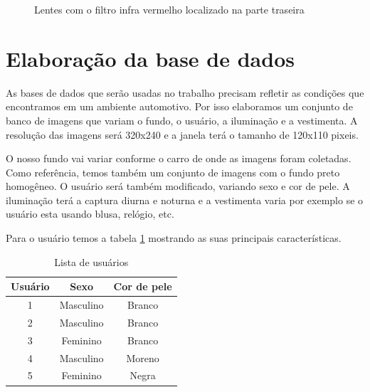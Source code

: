 \begin{figure}[ht!]
	\centering
	\setlength{\fboxsep}{1pt}
  	\caption{Lentes com o filtro infra vermelho localizado na parte traseira}
  	\label{fig:camera_02}
\end{figure}

\section{Elaboração da base de dados}

As bases de dados que serão usadas no trabalho precisam refletir as condições que encontramos em um ambiente automotivo. Por isso elaboramos um conjunto de banco de imagens que variam o fundo, o usuário, a iluminação e a vestimenta. A resolução das imagens será 320x240 e a janela terá o tamanho de 120x110 pixeis.

O nosso fundo vai variar conforme o carro de onde as imagens foram coletadas. Como referência, temos também um conjunto de imagens com o fundo preto homogêneo.
O usuário será também modificado, variando sexo e cor de pele. A iluminação terá a captura diurna e noturna e a vestimenta varia por exemplo se o usuário esta usando blusa, relógio, etc.

Para o usuário temos a tabela \ref{table:usuarios} mostrando as suas principais características.

\begin{table}[h]
	\centering
	\begin{tabular}{|c|c|c|}
		\hline Usuário & Sexo & Cor de pele \\
		\hline 1 & Masculino & Branco \\
		\hline 2 & Masculino & Branco \\
		\hline 3 & Feminino & Branco \\
		\hline 4 & Masculino & Moreno \\
		\hline 5 & Feminino & Negra \\
		\hline
	\end{tabular}
	\caption{Lista de usuários}
	\label{table:usuarios}
\end{table}

